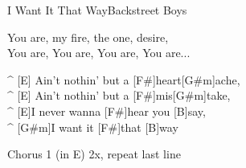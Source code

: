 \begin{song}{I Want It That Way}{Backstreet Boys}
\begin{guitar}
You are, my fire, the one, desire,\\
You are, You are, You are, You are...\\
\end{guitar}



\begin{guitar}
^ [E] Ain't nothin' but a [F#]heart[G#m]ache,\\
^ [E] Ain't nothin' but a [F#]mis[G#m]take,\\
^ [E]I never wanna [F#]hear you [B]say,\\
^ [G#m]I want it [F#]that [B]way\\
\end{guitar}

\begin{guitar}
Chorus 1 (in E) 2x, repeat last line\\
\end{guitar}

\end{song}
